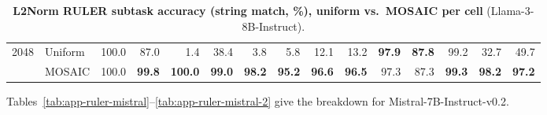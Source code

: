 \begin{table}[tp]
\begin{tabular}{@{} c l rrrrrrrrrrrrr @{}}
    \cmidrule(l){1-15}
    \multirow{2}{*}{2048} & Uniform & 100.0 & 87.0 & 1.4 & 38.4 & 3.8 & 5.8 & 12.1 & 13.2 & \textbf{97.9} & \textbf{87.8} & 99.2 & 32.7 & 49.7 \\
     & MOSAIC & 100.0 & \textbf{99.8} & \textbf{100.0} & \textbf{99.0} & \textbf{98.2} & \textbf{95.2} & \textbf{96.6} & \textbf{96.5} & 97.3 & 87.3 & \textbf{99.3} & \textbf{98.2} & \textbf{97.2} \\
    \bottomrule
  \end{tabular}
  \caption{\textbf{L2Norm RULER subtask accuracy (string match, \%), uniform vs.\ MOSAIC per cell} (Llama-3-8B-Instruct).}
  \label{tab:app-ruler-l2norm}
\end{table}


Tables~\ref{tab:app-ruler-mistral}--\ref{tab:app-ruler-mistral-2} give the breakdown for Mistral-7B-Instruct-v0.2.

